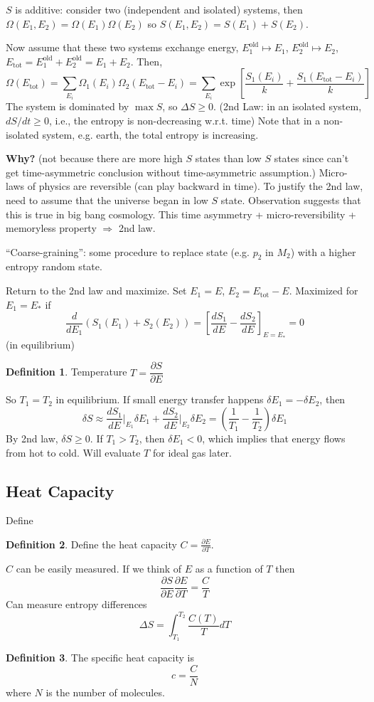 \documentclass{article}
\theoremstyle{definition}
\newtheorem{defn}{Definition}[section]
\theoremstyle{remark}
\theoremstyle{plain}
\begin{document}
$S$ is additive: consider two (independent and isolated) systems, then $\Omega(E_1,E_2)=\Omega(E_1)\Omega(E_2)$ so $S(E_1,E_2)=S(E_1)+S(E_2)$.

Now assume that these two systems exchange energy, $E^{\text{old}}_1\mapsto E_1$, $E_2^{\text{old}}\mapsto E_2$, $E_{\text{tot}}=E_1^{\text{old}}+E_2^{\text{old}}=E_1+E_2$. Then,
\[\Omega(E_{\text{tot}})=\sum_{E_i}\Omega_1(E_i)\Omega_2(E_{\text{tot}}-E_i)=\sum_{E_i}\exp\left[\dfrac{S_1(E_i)}{k}+\dfrac{S_1(E_{\text{tot}}-E_i)}{k}\right]\]
The system is dominated by $\max S$, so $\Delta S\ge 0$. (2nd Law: in an isolated system, $dS/dt\ge 0$, i.e., the entropy is non-decreasing w.r.t. time) Note that in a non-isolated system, e.g. earth, the total entropy is increasing.

\textbf{Why?} (not because there are more high $S$ states than low $S$ states since can't get time-asymmetric conclusion without time-asymmetric assumption.) 
Micro-laws of physics are reversible (can play backward in time).
To justify the 2nd law, need to assume that the universe began in low $S$ state. Observation suggests that this is true in big bang cosmology. This time asymmetry + micro-reversibility + memoryless property $\Rightarrow$ 2nd law.

``Coarse-graining'': some procedure to replace state (e.g. $p_2$ in $M_2$) with a higher entropy random state.


Return to the 2nd law and maximize. Set $E_1=E$, $E_2=E_{\text{tot}}-E$. Maximized for $E_1=E_\ast$ if
\[\dfrac{d}{dE_1}(S_1(E_1)+S_2(E_2))=\left[\dfrac{dS_1}{dE}-\dfrac{dS_2}{dE}\right]_{E=E_\ast}=0\]
(in equilibrium)

\begin{defn}
    Temperature $T=\dfrac{\partial S}{\partial E}$
\end{defn}
So $T_1=T_2$ in equilibrium. If small energy transfer happens $\delta E_1=-\delta E_2$, then
\[\delta S\approx \dfrac{dS_1}{dE}\Bigg|_{E_1}\delta E_1+\dfrac{dS_2}{dE}\Bigg|_{E_2}\delta E_2=\left(\dfrac{1}{T_1}-\dfrac{1}{T_2}\right)\delta E_1\]
By 2nd law, $\delta S\ge0$. If $T_1>T_2$, then $\delta E_1<0$, which implies that energy flows from hot to cold. Will evaluate $T$ for ideal gas later.

\subsection{Heat Capacity}
Define
\begin{defn}
    Define the heat capacity $C=\frac{\partial E}{\partial T}$.
\end{defn}
$C$ can be easily measured. If we think of $E$ as a function of $T$ then 
\[\dfrac{\partial S}{\partial E}\dfrac{\partial E}{\partial T}=\dfrac{C}{T}\]
Can measure entropy differences
\[\Delta S=\int_{T_1}^{T_2}\dfrac{C(T)}{T}dT\]
\begin{defn}
    The specific heat capacity is 
    \[c=\dfrac{C}{N}\]
    where $N$ is the number of molecules.
\end{defn}
\end{document}
